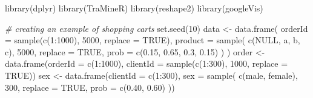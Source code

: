 \documentclass[
]{book}
\newenvironment{Shaded}{\begin{snugshade}}{\end{snugshade}}
\newcommand{\AttributeTok}[1]{\textcolor[rgb]{0.77,0.63,0.00}{#1}}
\newcommand{\CommentTok}[1]{\textcolor[rgb]{0.56,0.35,0.01}{\textit{#1}}}
\newcommand{\ConstantTok}[1]{\textcolor[rgb]{0.00,0.00,0.00}{#1}}
\newcommand{\DecValTok}[1]{\textcolor[rgb]{0.00,0.00,0.81}{#1}}
\newcommand{\FloatTok}[1]{\textcolor[rgb]{0.00,0.00,0.81}{#1}}
\newcommand{\FunctionTok}[1]{\textcolor[rgb]{0.00,0.00,0.00}{#1}}
\newcommand{\NormalTok}[1]{#1}
\newcommand{\OtherTok}[1]{\textcolor[rgb]{0.56,0.35,0.01}{#1}}
\newcommand{\SpecialCharTok}[1]{\textcolor[rgb]{0.00,0.00,0.00}{#1}}
\newcommand{\StringTok}[1]{\textcolor[rgb]{0.31,0.60,0.02}{#1}}
\begin{document}
\begin{Shaded}
\begin{Highlighting}[]
\FunctionTok{library}\NormalTok{(dplyr)}
\FunctionTok{library}\NormalTok{(TraMineR)}
\FunctionTok{library}\NormalTok{(reshape2)}
\FunctionTok{library}\NormalTok{(googleVis)}

\CommentTok{\# creating an example of shopping carts}
\FunctionTok{set.seed}\NormalTok{(}\DecValTok{10}\NormalTok{)}
\NormalTok{data }\OtherTok{\textless{}{-}} \FunctionTok{data.frame}\NormalTok{(}
    \AttributeTok{orderId =} \FunctionTok{sample}\NormalTok{(}\FunctionTok{c}\NormalTok{(}\DecValTok{1}\SpecialCharTok{:}\DecValTok{1000}\NormalTok{), }\DecValTok{5000}\NormalTok{, }\AttributeTok{replace =} \ConstantTok{TRUE}\NormalTok{),}
    \AttributeTok{product =} \FunctionTok{sample}\NormalTok{(}
        \FunctionTok{c}\NormalTok{(}\StringTok{\textquotesingle{}NULL\textquotesingle{}}\NormalTok{, }\StringTok{\textquotesingle{}a\textquotesingle{}}\NormalTok{, }\StringTok{\textquotesingle{}b\textquotesingle{}}\NormalTok{, }\StringTok{\textquotesingle{}c\textquotesingle{}}\NormalTok{),}
        \DecValTok{5000}\NormalTok{,}
        \AttributeTok{replace =} \ConstantTok{TRUE}\NormalTok{,}
        \AttributeTok{prob =} \FunctionTok{c}\NormalTok{(}\FloatTok{0.15}\NormalTok{, }\FloatTok{0.65}\NormalTok{, }\FloatTok{0.3}\NormalTok{, }\FloatTok{0.15}\NormalTok{)}
\NormalTok{    )}
\NormalTok{)}
\NormalTok{order }\OtherTok{\textless{}{-}} \FunctionTok{data.frame}\NormalTok{(}\AttributeTok{orderId =} \FunctionTok{c}\NormalTok{(}\DecValTok{1}\SpecialCharTok{:}\DecValTok{1000}\NormalTok{),}
                    \AttributeTok{clientId =} \FunctionTok{sample}\NormalTok{(}\FunctionTok{c}\NormalTok{(}\DecValTok{1}\SpecialCharTok{:}\DecValTok{300}\NormalTok{), }\DecValTok{1000}\NormalTok{, }\AttributeTok{replace =} \ConstantTok{TRUE}\NormalTok{))}
\NormalTok{sex }\OtherTok{\textless{}{-}} \FunctionTok{data.frame}\NormalTok{(}\AttributeTok{clientId =} \FunctionTok{c}\NormalTok{(}\DecValTok{1}\SpecialCharTok{:}\DecValTok{300}\NormalTok{),}
                  \AttributeTok{sex =} \FunctionTok{sample}\NormalTok{(}
                      \FunctionTok{c}\NormalTok{(}\StringTok{\textquotesingle{}male\textquotesingle{}}\NormalTok{, }\StringTok{\textquotesingle{}female\textquotesingle{}}\NormalTok{),}
                      \DecValTok{300}\NormalTok{,}
                      \AttributeTok{replace =} \ConstantTok{TRUE}\NormalTok{,}
                      \AttributeTok{prob =} \FunctionTok{c}\NormalTok{(}\FloatTok{0.40}\NormalTok{, }\FloatTok{0.60}\NormalTok{)}
\NormalTok{                  ))}

\end{Highlighting}
\end{Shaded}
\end{document}
